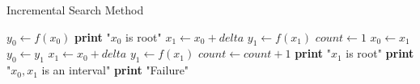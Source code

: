 \documentclass{article}
\begin{document}
  \begin{algorithm}
    \caption{Incremental Search Method}
    \begin{algorithmic}[1]
        \State $y_{0} \gets f(x_{0})$
          \State \textbf{print} "$x_{0}$ is root"
          \Else {}
            \State $x_{1} \gets x_{0} + delta$
            \State $y_{1} \gets f(x_{1})$
            \State $count \gets 1$
        \EndIf
          \State $x_{0} \gets x_{1}$
          \State $y_{0} \gets y_{1}$
          \State $x_{1} \gets x_{0} + delta$
          \State $y_{1} \gets f(x_{1})$
          \State $count \gets count + 1$
        \EndWhile
          \State \textbf{print} "$x_{1}$ is root"
          \State \textbf{print} "$x_{0},x_{1}$ is an interval"
        \Else
          \State \textbf{print} "Failure"
        \EndIf
      \EndProcedure
    \end{algorithmic}
  \end{algorithm}
\end{document}
